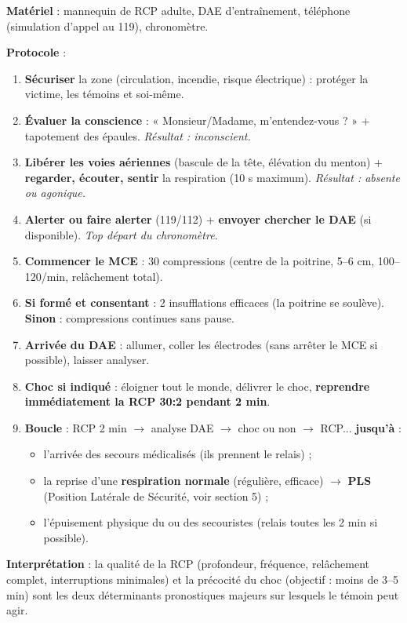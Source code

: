 \documentclass[11pt]{article}
\begin{document}
\begin{experience}
\textbf{Matériel} : mannequin de RCP adulte, DAE d'entraînement, téléphone (simulation d'appel au 119), chronomètre.

\textbf{Protocole} :
\begin{enumerate}
    \item \textbf{Sécuriser} la zone (circulation, incendie, risque électrique) : protéger la victime, les témoins et soi-même.
    \item \textbf{Évaluer la conscience} : « Monsieur/Madame, m'entendez-vous ? » + tapotement des épaules. \textit{Résultat : inconscient.}
    \item \textbf{Libérer les voies aériennes} (bascule de la tête, élévation du menton) + \textbf{regarder, écouter, sentir} la respiration (10 s maximum). \textit{Résultat : absente ou agonique.}
    \item \textbf{Alerter ou faire alerter} (119/112) + \textbf{envoyer chercher le DAE} (si disponible). \textit{Top départ du chronomètre.}
    \item \textbf{Commencer le MCE} : 30 compressions (centre de la poitrine, 5--6 cm, 100--120/min, relâchement total).
    \item \textbf{Si formé et consentant} : 2 insufflations efficaces (la poitrine se soulève). \textbf{Sinon} : compressions continues sans pause.
    \item \textbf{Arrivée du DAE} : allumer, coller les électrodes (sans arrêter le MCE si possible), laisser analyser.
    \item \textbf{Choc si indiqué} : éloigner tout le monde, délivrer le choc, \textbf{reprendre immédiatement la RCP 30:2 pendant 2 min}.
    \item \textbf{Boucle} : RCP 2 min $\rightarrow$ analyse DAE $\rightarrow$ choc ou non $\rightarrow$ RCP... \textbf{jusqu'à} :
    \begin{itemize}
        \item l'arrivée des secours médicalisés (ils prennent le relais) ;
        \item la reprise d'une \textbf{respiration normale} (régulière, efficace) $\rightarrow$ \textbf{PLS} (Position Latérale de Sécurité, voir section 5) ;
        \item l'épuisement physique du ou des secouristes (relais toutes les 2 min si possible).
    \end{itemize}
\end{enumerate}
\textbf{Interprétation} : la qualité de la RCP (profondeur, fréquence, relâchement complet, interruptions minimales) et la précocité du choc (objectif : moins de 3--5 min) sont les deux déterminants pronostiques majeurs sur lesquels le témoin peut agir.
\end{experience}
\end{document}
